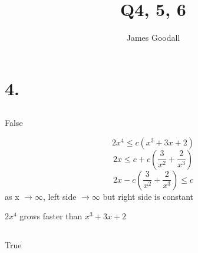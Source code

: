 \documentclass{article}
\author{James Goodall}
\title{Q4, 5, 6}
\begin{document}
\maketitle

\section{4.}
    \subsection{}

False

\[2x^4 \le c(x^3+3x+2)\]
\[2x \le c+c(\frac{3}{x^2}+\frac{2}{x^3})\]
\[2x- c(\frac{3}{x^2}+\frac{2}{x^3}) \le c\]
as x \(\to \infty\), left side \(\to \infty\) but right side is constant

\(2x^4\) grows faster than \(x^3+3x+2\)

    \subsection{}

True
\end{document}
